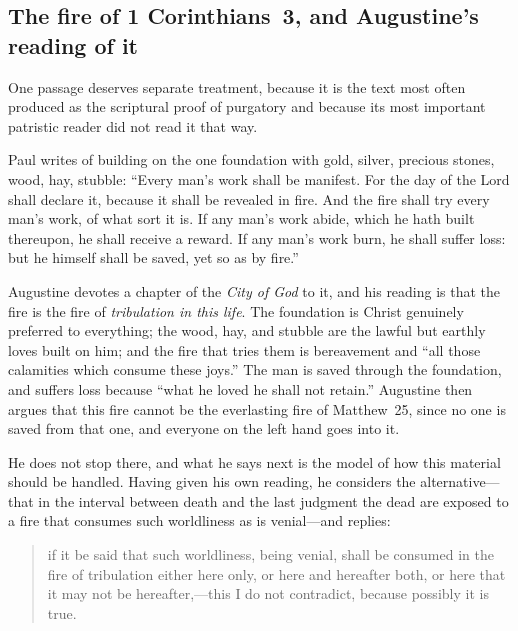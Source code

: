 \subsection{The fire of 1 Corinthians~3, and Augustine's reading of it}

One passage deserves separate treatment, because it is the text most often produced as the scriptural proof of purgatory and because its most important patristic reader did not read it that way.

Paul writes of building on the one foundation with gold, silver, precious stones, wood, hay, stubble: ``Every man's work shall be manifest. For the day of the Lord shall declare it, because it shall be revealed in fire. And the fire shall try every man's work, of what sort it is. If any man's work abide, which he hath built thereupon, he shall receive a reward. If any man's work burn, he shall suffer loss: but he himself shall be saved, yet so as by fire.''

Augustine devotes a chapter of the \emph{City of God} to it, and his reading is that the fire is the fire of \emph{tribulation in this life}. The foundation is Christ genuinely preferred to everything; the wood, hay, and stubble are the lawful but earthly loves built on him; and the fire that tries them is bereavement and ``all those calamities which consume these joys.'' The man is saved through the foundation, and suffers loss because ``what he loved he shall not retain.'' Augustine then argues that this fire cannot be the everlasting fire of Matthew~25, since no one is saved from that one, and everyone on the left hand goes into it.

He does not stop there, and what he says next is the model of how this material should be handled. Having given his own reading, he considers the alternative---that in the interval between death and the last judgment the dead are exposed to a fire that consumes such worldliness as is venial---and replies:

\begin{quote}
if it be said that such worldliness, being venial, shall be consumed in the fire of tribulation either here only, or here and hereafter both, or here that it may not be hereafter,---this I do not contradict, because possibly it is true.
\end{quote}

